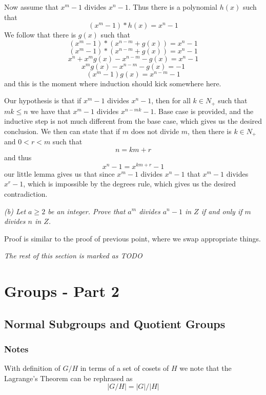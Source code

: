 \documentclass[11pt,oneside,titlepage]{book}
\begin{document}
Now assume that $x^m - 1$ divides $x^n - 1$. Thus there is a polynomial $h(x)$
such that
$$(x^m - 1) * h(x) = x^n - 1$$
We follow that there is $g(x)$ such that
$$(x^m - 1) * (x^{n - m} + g(x)) = x^n - 1$$
$$(x^m - 1) * (x^{n - m} + g(x)) = x^n - 1$$
$$x^n + x^mg(x) - x^{n - m} - g(x)  = x^n - 1$$
$$x^mg(x) - x^{n - m} - g(x)  =  - 1$$
$$(x^m - 1)g(x) = x^{n - m}  - 1$$
and this is the moment where induction should kick somewhere here.

Our hypothesis is that if $x^m - 1$ divides $x^n - 1$, then for all $k
\in N_+$ such that $mk \leq n$ we have that $x^m - 1$ divides $x^{n -
mk} - 1$. Base case is provided, and the inductive step is not much
different from the base case, which gives us the desired conclusion. We
then can state that if $m$ does not divide $m$, then there is $k \in
N_+$ and $0 < r < m$ such that
$$n = km + r$$
and thus
$$x^{n} - 1 = x^{km + r} - 1$$
our little lemma gives us that since $x^m - 1$ divides $x^n - 1$
that $x^m - 1$ divides $x^{r} - 1$, which is impossible by the
degrees rule, which gives us the desired contradiction.

\textit{(b) Let $a \geq 2$ be an integer. Prove that $a^m$ divides
  $a^n - 1$ in $Z$ if and only if $m$ divides $n$ in $Z$.}

Proof is similar to the proof of previous point, where we swap
appropriate things.

\textit{The rest of this section is marked as TODO}

\chapter{Groups - Part  2}

\section{Normal Subgroups and Quotient Groups}

\subsection*{Notes}

With definition of $G/H$ in terms of a set of cosets of $H$ we note that the
Lagrange's Theorem can be rephrased as
$$|G/H| = |G|/|H|$$

\subsection{}
\end{document}
